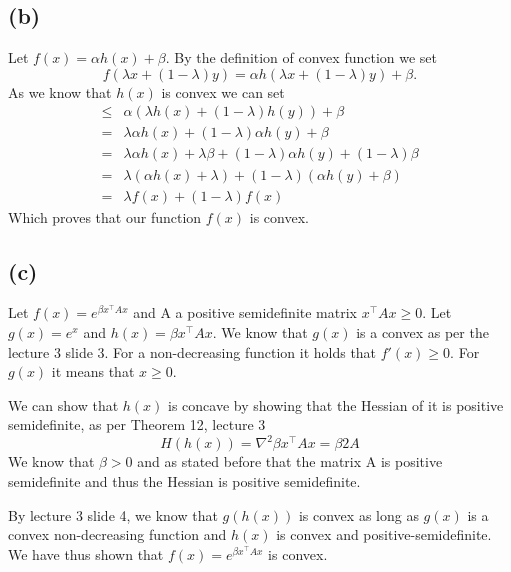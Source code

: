 \documentclass{article}
\begin{document}
	\subsection*{(b)}
	Let $f(x)=\alpha h(x) + \beta$.
	By the definition of convex function we set
	\begin{equation}
		f(\lambda x + (1-\lambda) y ) =
		\alpha h(\lambda x + (1-\lambda) y ) + \beta.
	\end{equation}
	As we know that $h(x)$ is convex we can set
	\begin{align}
		\leq& \alpha (\lambda h(x) + (1-\lambda) h(y) ) + \beta \\
		= &\lambda \alpha h(x) + (1-\lambda)\alpha h(y) + \beta \\
		= & \lambda \alpha h(x) + \lambda\beta + (1-\lambda)\alpha h(y) + (1-\lambda)\beta \\
		=& \lambda (\alpha h(x) + \lambda) + (1-\lambda)(\alpha h(y) + \beta) \\
		=& \lambda f(x) + (1-\lambda)f(x)
	\end{align}
	Which proves that our function $f(x)$ is convex.
	\subsection*{(c)}
	Let $f(x) = e^{\beta x^\top A x}$ and A a positive semidefinite matrix $x^\top A x \geq 0$. Let $g(x)=e^x$ and $h(x)=\beta x^\top A x$. We know that $g(x)$ is a convex as per the lecture 3 slide 3. For a non-decreasing function it holds that $f'(x)\geq 0$. For $g(x)$ it means that $x\geq 0$.
	
	We can show that $h(x)$ is concave by showing that the Hessian of it is positive semidefinite, as per Theorem 12, lecture 3
	\begin{equation}
		H(h(x)) = \nabla^2 \beta x^\top A x = \beta 2 A
	\end{equation}
	We know that $\beta > 0$ and as stated before that the matrix A is positive semidefinite and thus the Hessian is positive semidefinite.
	
	By lecture 3 slide 4, we know that $g(h(x))$ is convex as long as $g(x)$ is a convex non-decreasing function and $h(x)$ is convex and positive-semidefinite. We have thus shown that $f(x) = e^{\beta x^\top A x}$ is convex.
\end{document}
